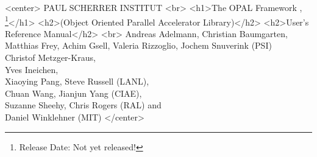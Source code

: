 \documentclass[a4paper]{book}
\begin{document}
\begin{titlepage}

\begin{htmlonly}
\begin{rawhtml}
<center>
PAUL SCHERRER INSTITUT
<br>
<h1>The OPAL Framework , \opalversion{} \footnote{Release Date: Not yet released!}</h1>
<h2>(Object Oriented Parallel Accelerator Library)</h2>
<h2>User's Reference Manual</h2>
<br>
Andreas Adelmann, Christian Baumgarten, Matthias Frey, Achim Gsell, Valeria Rizzoglio, Jochem Snuverink (PSI)\\ Christof Metzger-Kraus, \\ Yves Ineichen,\\ Xiaoying Pang, Steve Russell (LANL),\\ Chuan Wang, Jianjun Yang (CIAE), \\  Suzanne Sheehy, Chris Rogers (RAL) and \\ Daniel Winklehner (MIT)
</center>
\end{rawhtml}
\end{htmlonly}



\end{titlepage}
\end{document}
